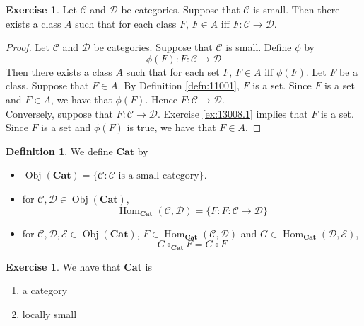 \documentclass[12pt]{amsart}
\theoremstyle{definition}
\newtheorem{defn}[definition]{Definition}
\newtheorem{ex}[definition]{Exercise}
\newcommand{\MC}{\mathcal{C}}
\newcommand{\MD}{\mathcal{D}}
\newcommand{\ME}{\mathcal{E}}
\newcommand{\tbf}[1]{\textbf{#1}}
\DeclareMathOperator{\Obj}{Obj}
\DeclareMathOperator{\Hom}{Hom}
\DeclareMathOperator*{\0}{\mbf{0}}
\DeclareMathOperator*{\1}{\mbf{1}}
\newcommand{\lex}[1]{\label{ex:#1}}
\newcommand{\ld}[1]{\label{defn:#1}}
\newcommand{\rex}[1]{Exercise \ref{ex:#1}}
\newcommand{\rd}[1]{Definition \ref{defn:#1}}
\begin{document}
	\begin{ex} \lex{13008.2}
		Let $\MC$ and $\MD$ be categories. Suppose that $\MC$ is small. Then there exists a class $A$ such that for each class $F$, $F \in A$ iff $F: \MC \rightarrow \MD$.   
	\end{ex}
	
	\begin{proof} 
		Let $\MC$ and $\MD$ be categories. Suppose that $\MC$ is small. Define $\phi$ by 
		$$\phi(F) : F : \MC \rightarrow \MD$$ 
		Then there exists a class $A$ such that for each set $F$, $F \in A$ iff $\phi(F)$. Let $F$ be a class. Suppose that $F \in A$. By \rd{11001}, $F$ is a set. Since $F$ is a set and $F \in A$, we have that $\phi(F)$. Hence $F: \MC \rightarrow \MD$. \\
		Conversely, suppose that $F: \MC \rightarrow \MD$. \rex{13008.1} implies that $F$ is a set. Since $F$ is a set and $\phi(F)$ is true, we have that $F \in A$. 
	\end{proof}
	
	\begin{defn} \ld{13009}
		We define $\tbf{Cat}$ by 
		\begin{itemize}
			\item $\Obj(\tbf{Cat}) = \{\MC: \MC \text{ is a small category}\}$.
			\item for $\MC,\MD \in \Obj(\tbf{Cat})$, 
			$$\Hom_{\tbf{Cat}}(\MC,\MD) = \{F : F: \MC \rightarrow \MD \}$$
			\item for $\MC,\MD, \ME \in \Obj(\tbf{Cat})$, $F \in \Hom_{\tbf{Cat}}(\MC,\MD)$ and $G \in \Hom_{\tbf{Cat}}(\MD, \ME)$, $$G \circ_{\tbf{Cat}} F = G \circ F$$
		\end{itemize}
	\end{defn}


	\begin{ex}  \lex{13010}
		We have that \tbf{Cat} is 
		\begin{enumerate}
			\item a category
			\item locally small
		\end{enumerate} 
	\end{ex}
\end{document}
